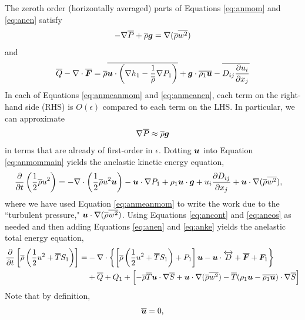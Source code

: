 \documentclass[12pt]{article}
\newcommand{\vecf}{\bm{F}}
\begin{document}
  The zeroth order (horizontally averaged) parts of Equations \eqref{eq:anmom} and \eqref{eq:anen} satisfy 
  \begin{align}\label{eq:anmeanmom}
  	-\nabla\overline{P} + \overline{\rho}\bm{g} = \nabla(\overline{\rho} \overline{w^2})
  \end{align}
  and
  \begin{align}\label{eq:anmeanen}
  	\qref - \Div\overline{\vecf} = \rhoref\overline{\vecu\cdot\left(\nabla h_1-\frac{1}{\rhoref}\nabla P_1\right)} + \vecg\cdot\overline{\rho_1\vecu} - \overline{D_{ij}\pderiv{u_i}{x_j}}
  \end{align}
  In each of Equations \eqref{eq:anmeanmom} and \eqref{eq:anmeanen}, each term on the right-hand side (RHS) is $O(\epsilon)$ compared to each term on the LHS. In particular, we can approximate 
  \begin{align}\label{eq:anhydrostatic}
  	\nabla\overline{P}\approx \overline{\rho}\bm{g}
  \end{align}
  in terms that are already of first-order in $\epsilon$. Dotting $\bm{u}$ into Equation \eqref{eq:anmommain} yields the anelastic kinetic energy equation,
	\begin{subequations}\label{eq:anke}
	\begin{align}
		\frac{\partial}{\partial t}\left(\frac{1}{2}\overline{\rho} u^2\right)&=-\nabla\cdot\left(\frac{1}{2}\overline{\rho} u^2\bm{u} \right) - \bm{u}\cdot\nabla P_1 + \rho_1\bm{u}\cdot\bm{g} + u_i\frac{\partial D_{ij}}{\partial x_j} + \bm{u}\cdot\nabla(\overline{\rho} \overline{w^2}),
	\end{align}
\end{subequations}
where we have used Equation \eqref{eq:anmeanmom} to write the work due to the ``turbulent pressure," $\bm{u}\cdot\nabla (\overline{\rho} \overline{w^2})$. 
Using Equations \eqref{eq:ancont} and \eqref{eq:aneos} as needed and then adding Equations \eqref{eq:anen} and \eqref{eq:anke} yields the anelastic total energy equation,
\begin{align}\label{eq:antote}
			\pderiv{}{t}\left[\rhoref\left(\frac{1}{2} u^2 + \tmpref S_1\right)\right] = &-\Div\left\{\left[\rhoref\left(\frac{1}{2} u^2 + \tmpref S_1\right) + P_1\right]\vecu- \vecu\cdot\overleftrightarrow{D} + \overline{\vecf} + \vecf_1\right\}\nonumber\\
			 &+ \qref + Q_1 +\left[-\rhoref\tmpref\ugrad\sref +\ugrad (\rhoref \overline{w^2})- \tmpref(\rho_1\vecu-\overline{\rho_1\vecu})\cdot\nabla\sref\right]
\end{align}
Note that by definition, 
\begin{align}
	\overline{\bm{u}}=0,
\end{align}
\end{document}
